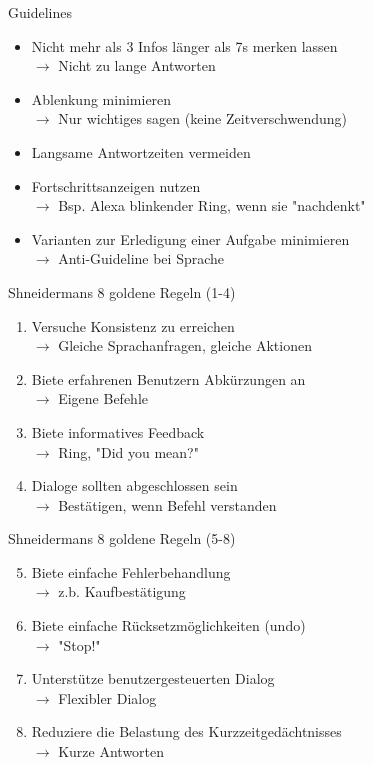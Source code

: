 \documentclass[
  10pt
, handout
]{beamer}
\begin{document}
\begin{frame}{Guidelines}
  \begin{itemize}
    \item<+-> Nicht mehr als 3 Infos länger als 7s merken lassen \\
              $\rightarrow$  Nicht zu lange Antworten
    \item<+-> Ablenkung minimieren \\ $\rightarrow$ Nur wichtiges sagen (keine Zeitverschwendung)
    \item<+-> Langsame Antwortzeiten vermeiden
    \item<+-> Fortschrittsanzeigen nutzen \\ $\rightarrow$ Bsp. Alexa blinkender Ring, wenn sie "nachdenkt"
    \item<+-> Varianten zur Erledigung einer Aufgabe minimieren \\ $\rightarrow$ Anti-Guideline bei Sprache
  \end{itemize}
\end{frame}

\begin{frame}{Shneidermans 8 goldene Regeln (1-4)}
  \begin{enumerate}
    \item<+-> Versuche Konsistenz zu erreichen \\
              $\rightarrow$ Gleiche Sprachanfragen, gleiche Aktionen
    \item<+-> Biete erfahrenen Benutzern Abkürzungen an \\
              $\rightarrow$ Eigene Befehle
    \item<+-> Biete informatives Feedback \\
              $\rightarrow$ Ring, "Did you mean?"
    \item<+-> Dialoge sollten abgeschlossen sein \\
              $\rightarrow$ Bestätigen, wenn Befehl verstanden
  \end{enumerate}
\end{frame}

\begin{frame}{Shneidermans 8 goldene Regeln (5-8)}
  \begin{enumerate}
    \setcounter{enumi}{4}
    \item<+-> Biete einfache Fehlerbehandlung \\
              $\rightarrow$ z.b. Kaufbestätigung
    \item<+-> Biete einfache Rücksetzmöglichkeiten (undo) \\
              $\rightarrow$ "Stop!"
    \item<+-> Unterstütze benutzergesteuerten Dialog \\
              $\rightarrow$ Flexibler Dialog
    \item<+-> Reduziere die Belastung des Kurzzeitgedächtnisses \\
              $\rightarrow$ Kurze Antworten
  \end{enumerate}
\end{frame}
\end{document}
